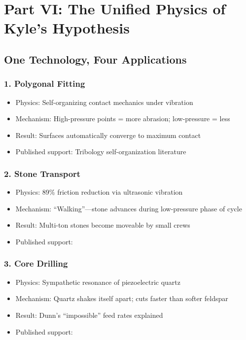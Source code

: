 \documentclass[11pt]{article}
\begin{document}
\section{Part VI: The Unified Physics of Kyle's Hypothesis}

\subsection{One Technology, Four Applications}

\subsubsection{1. Polygonal Fitting}
\begin{itemize}
    \item Physics: Self-organizing contact mechanics under vibration
    \item Mechanism: High-pressure points = more abrasion; low-pressure = less
    \item Result: Surfaces automatically converge to maximum contact
    \item Published support: Tribology self-organization literature
\end{itemize}

\subsubsection{2. Stone Transport}
\begin{itemize}
    \item Physics: 89\% friction reduction via ultrasonic vibration
    \item Mechanism: ``Walking''---stone advances during low-pressure phase of cycle
    \item Result: Multi-ton stones become moveable by small crews
    \item Published support: \citep{Luo2024, Popov2020}
\end{itemize}

\subsubsection{3. Core Drilling}
\begin{itemize}
    \item Physics: Sympathetic resonance of piezoelectric quartz
    \item Mechanism: Quartz shakes itself apart; cuts faster than softer feldspar
    \item Result: Dunn's ``impossible'' feed rates explained
    \item Published support: \citep{Saksala2023}
\end{itemize}
\end{document}
